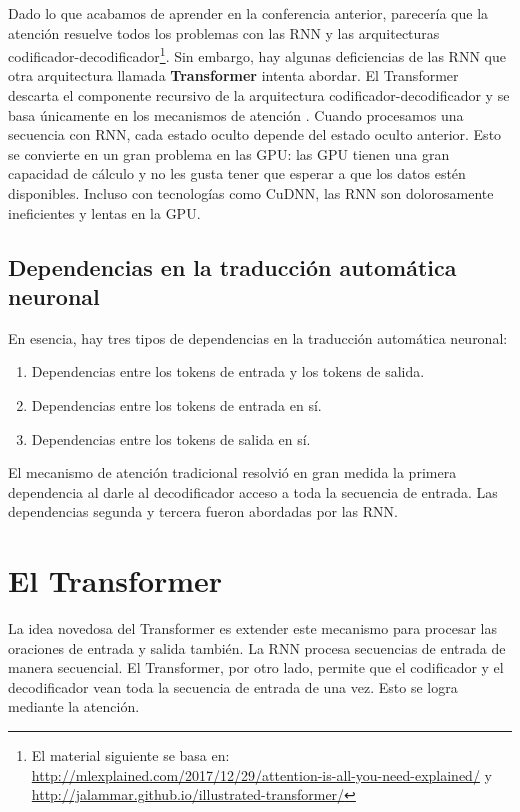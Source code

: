 Dado lo que acabamos de aprender en la conferencia anterior, parecería que la atención resuelve todos los problemas con las RNN y las arquitecturas codificador-decodificador\footnote{El material siguiente se basa en: \url{http://mlexplained.com/2017/12/29/attention-is-all-you-need-explained/} y \url{http://jalammar.github.io/illustrated-transformer/}}. Sin embargo, hay algunas deficiencias de las RNN que otra arquitectura llamada \textbf{Transformer} intenta abordar. El Transformer descarta el componente recursivo de la arquitectura codificador-decodificador y se basa únicamente en los mecanismos de atención \cite{vaswani2017attention}. Cuando procesamos una secuencia con RNN, cada estado oculto depende del estado oculto anterior. Esto se convierte en un gran problema en las GPU: las GPU tienen una gran capacidad de cálculo y no les gusta tener que esperar a que los datos estén disponibles. Incluso con tecnologías como CuDNN, las RNN son dolorosamente ineficientes y lentas en la GPU.


\subsection{Dependencias en la traducción automática neuronal}
En esencia, hay tres tipos de dependencias en la traducción automática neuronal:
\begin{enumerate}
\item Dependencias entre los tokens de entrada y los tokens de salida.
\item Dependencias entre los tokens de entrada en sí.
\item Dependencias entre los tokens de salida en sí.
\end{enumerate}

El mecanismo de atención tradicional resolvió en gran medida la primera dependencia al darle al decodificador acceso a toda la secuencia de entrada. Las dependencias segunda y tercera fueron abordadas por las RNN.

\section{El Transformer}
La idea novedosa del Transformer es extender este mecanismo para procesar las oraciones de entrada y salida también. La RNN procesa secuencias de entrada de manera secuencial. El Transformer, por otro lado, permite que el codificador y el decodificador vean toda la secuencia de entrada de una vez. Esto se logra mediante la atención.

